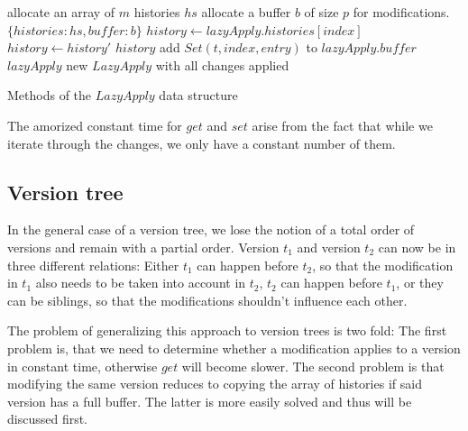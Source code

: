 \documentclass[11pt]{Thesis}
\theoremstyle{definition}
\begin{document}
\begin{algorithm*}
\begin{algorithmic}[1]
  \State allocate an array of $m$ histories $hs$
  \State allocate a buffer $b$ of size $p$ for modifications.
  \State \Return $\{ histories: hs, buffer: b\}$
\EndFunction
{}
  \State $history \leftarrow lazyApply.histories[index]$
      \State $history \leftarrow history'$
    \EndIf
  \EndFor
  \State \Return $history$
\EndFunction
\Statex
{}
    \State add $Set(t, index, entry)$ to $lazyApply.buffer$
    \State \Return $lazyApply$
  \Else
    \State\Return new $LazyApply$ with all changes applied
  \EndIf
\EndFunction
\end{algorithmic}
\caption{\label{alg:lazy-apply-1}Methods of the $LazyApply$ data structure}
\end{algorithm*}

The amorized constant time for $get$ and $set$ arise from the fact that while 
we iterate through the changes, we only have a constant number of them.

\subsection{Version tree}
In the general case of a version tree, we lose the notion of a total order of
versions and remain with a partial order. Version $t_1$ and version $t_2$ can 
now be in three different relations: Either $t_1$ can happen before $t_2$, so 
that the modification in $t_1$ also needs to be taken into account in $t_2$, 
$t_2$ can happen before $t_1$, or they can be siblings, so that the 
modifications shouldn't influence each other. 

The problem of generalizing this approach to version trees is two fold: The 
first problem is, that we need to determine whether a modification applies to a
version in constant time, otherwise $get$ will become slower. The second 
problem is that modifying the same version reduces to copying the array of 
histories if said version has a full buffer. The latter is more easily solved 
and thus will be discussed first.
\end{document}
